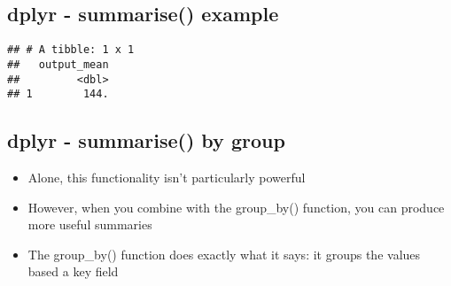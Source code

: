 \documentclass[]{article}
\newenvironment{Shaded}{\begin{snugshade}}{\end{snugshade}}
\newcommand{\KeywordTok}[1]{\textcolor[rgb]{0.13,0.29,0.53}{\textbf{#1}}}
\newcommand{\DataTypeTok}[1]{\textcolor[rgb]{0.13,0.29,0.53}{#1}}
\newcommand{\DecValTok}[1]{\textcolor[rgb]{0.00,0.00,0.81}{#1}}
\newcommand{\StringTok}[1]{\textcolor[rgb]{0.31,0.60,0.02}{#1}}
\newcommand{\OperatorTok}[1]{\textcolor[rgb]{0.81,0.36,0.00}{\textbf{#1}}}
\newcommand{\NormalTok}[1]{#1}
\providecommand{\tightlist}{%
  \setlength{\itemsep}{0pt}\setlength{\parskip}{0pt}}
\begin{document}
\subsection{dplyr - summarise()
example}\label{dplyr---summarise-example}

\begin{Shaded}
\end{Shaded}

\begin{verbatim}
## # A tibble: 1 x 1
##   output_mean
##         <dbl>
## 1        144.
\end{verbatim}

\subsection{dplyr - summarise() by
group}\label{dplyr---summarise-by-group}

\begin{itemize}
\tightlist
\item
  Alone, this functionality isn't particularly powerful
\item
  However, when you combine with the group\_by() function, you can
  produce more useful summaries
\item
  The group\_by() function does exactly what it says: it groups the
  values based a key field
\end{itemize}
\end{document}
